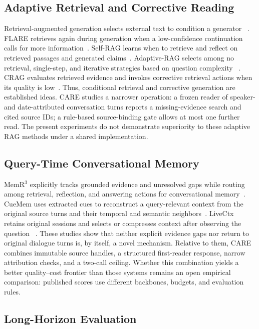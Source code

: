 \documentclass[11pt]{article}
\newcommand{\care}{\textsc{CARE}}
\begin{document}
\subsection{Adaptive Retrieval and Corrective Reading}

Retrieval-augmented generation selects external text to condition a generator
~\cite{lewis2020rag}. FLARE retrieves again during generation when a
low-confidence continuation calls for more information~\cite{jiang2023active}.
Self-RAG learns when to retrieve and reflect on retrieved passages and generated
claims~\cite{asai2023selfrag}. Adaptive-RAG selects among no retrieval,
single-step, and iterative strategies based on question complexity
~\cite{jeong2024adaptive}. CRAG evaluates retrieved evidence and invokes
corrective retrieval actions when its quality is low~\cite{yan2024crag}.
Thus, conditional retrieval and corrective generation are established ideas.
\care{} studies a narrower operation: a frozen reader of speaker- and
date-attributed conversation turns reports a missing-evidence search and
cited source IDs; a rule-based source-binding gate allows at most one further
read. The present experiments do not demonstrate superiority to these
adaptive RAG methods under a shared implementation.

\subsection{Query-Time Conversational Memory}

MemR$^3$ explicitly tracks grounded evidence and unresolved gaps while
routing among retrieval, reflection, and answering actions for conversational
memory~\cite{du2026memr3}. CueMem uses extracted cues to reconstruct a
query-relevant context from the original source turns and their temporal and
semantic neighbors~\cite{wang2026cuemem}. LiveCtx retains original sessions
and selects or compresses context after observing the question
~\cite{liu2026livectx}. These studies show that neither explicit evidence
gaps nor return to original dialogue turns is, by itself, a novel mechanism.
Relative to them, \care{} combines immutable source handles, a structured
first-reader response, narrow attribution checks, and a two-call ceiling.
Whether this combination yields a better quality--cost frontier than those
systems remains an open empirical comparison: published scores use different
backbones, budgets, and evaluation rules.

\subsection{Long-Horizon Evaluation}
\end{document}
